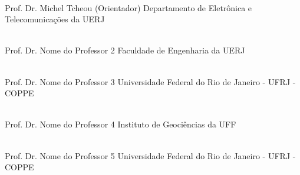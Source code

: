 \begin{flushright}
\parbox{12cm}{

\singlespacing

\hrulefill \\

\vspace{-.4cm}
Prof. Dr. Michel Tcheou (Orientador)
\newline
Departamento de Eletrônica e Telecomunicações  da UERJ
\vspace{.7cm}

\hrulefill \\

\vspace{-.4cm}
Prof. Dr. Nome do Professor 2
\newline
Faculdade de Engenharia da UERJ
\vspace{.7cm}

\hrulefill \\

\vspace{-.4cm}
Prof. Dr. Nome do Professor 3
\newline
Universidade Federal do Rio de Janeiro - UFRJ - COPPE
\vspace{.7cm}

\hrulefill \\

\vspace{-.4cm}
Prof. Dr. Nome do Professor 4
\newline
Instituto de Geociências da UFF
\vspace{.7cm}

\hrulefill \\

\vspace{-.4cm}
Prof. Dr. Nome do Professor 5
\newline
Universidade Federal do Rio de Janeiro - UFRJ - COPPE
\vspace{.7cm}

}
\end{flushright}
\vfill

\begin{center}
\setLocationDate
\end{center}
